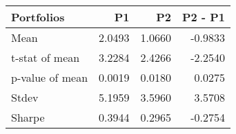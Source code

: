 \begin{tabular}{lrrr}
\toprule
Portfolios & P1 & P2 & P2 - P1 \\
\midrule
Mean & 2.0493 & 1.0660 & -0.9833 \\
t-stat of mean & 3.2284 & 2.4266 & -2.2540 \\
p-value of mean & 0.0019 & 0.0180 & 0.0275 \\
Stdev & 5.1959 & 3.5960 & 3.5708 \\
Sharpe & 0.3944 & 0.2965 & -0.2754 \\
\bottomrule
\end{tabular}

